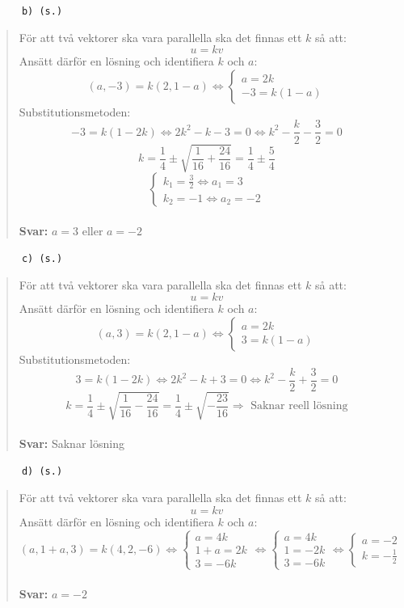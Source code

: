 \documentclass[a4paper]{article}
\newcommand{\tskcol}[1]{\textcolor{tskcol}{#1}}
\begin{document}
\texttt{\tskcol{~~~~~~b) (s.)}}
\begin{quotation}
	\noindent
	För att två vektorer ska vara parallella ska det finnas ett $k$ så att:
	\[u=kv\]
	Ansätt därför en lösning och identifiera $k$ och $a$:
	\[(a,-3)=k(2,1-a) \Leftrightarrow
	\begin{cases}
	a=2k \\
	-3=k(1-a)
	\end{cases}\]
	Substitutionsmetoden:
	\[-3=k(1-2k) \Leftrightarrow
	2k^2-k-3=0 \Leftrightarrow
	k^2-\frac{k}{2}-\frac{3}{2}=0\]
	\[k=\frac{1}{4}\pm\sqrt{\frac{1}{16}+\frac{24}{16}}=\frac{1}{4}\pm\frac{5}{4}\]
	\[\begin{cases}
	k_1=\frac{3}{2} \Leftrightarrow a_1=3 \\
	k_2=-1 \Leftrightarrow a_2=-2
	\end{cases}\]
	\\
	\textbf{Svar:} $a=3$ eller $a=-2$
\end{quotation}

\texttt{\tskcol{~~~~~~c) (s.)}}
\begin{quotation}
	\noindent
	För att två vektorer ska vara parallella ska det finnas ett $k$ så att:
	\[u=kv\]
	Ansätt därför en lösning och identifiera $k$ och $a$:
	\[(a,3)=k(2,1-a) \Leftrightarrow
	\begin{cases}
	a=2k \\
	3=k(1-a)
	\end{cases}\]
	Substitutionsmetoden:
	\[3=k(1-2k) \Leftrightarrow
	2k^2-k+3=0 \Leftrightarrow
	k^2-\frac{k}{2}+\frac{3}{2}=0\]
	\[k=\frac{1}{4}\pm\sqrt{\frac{1}{16}-\frac{24}{16}}=\frac{1}{4}\pm\sqrt{-\frac{23}{16}} \Rightarrow \text{ Saknar reell lösning}\]
	\\
	\textbf{Svar:} Saknar lösning
\end{quotation}

\texttt{\tskcol{~~~~~~d) (s.)}}
\begin{quotation}
	\noindent
	För att två vektorer ska vara parallella ska det finnas ett $k$ så att:
	\[u=kv\]
	Ansätt därför en lösning och identifiera $k$ och $a$:
	\[(a,1+a,3)=k(4,2,-6) \Leftrightarrow
	\begin{cases}
	a=4k \\
	1+a=2k \\
	3=-6k
	\end{cases} \Leftrightarrow
	\begin{cases}
	a=4k \\
	1=-2k \\
	3=-6k
	\end{cases} \Leftrightarrow
	\begin{cases}
	a=-2 \\
	k=-\frac{1}{2}
	\end{cases}\]
	\\
	\textbf{Svar:} $a=-2$
\end{quotation}
\end{document}
